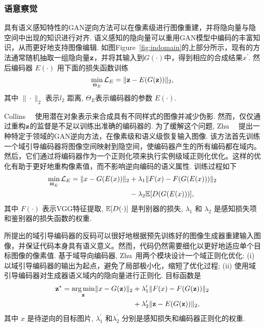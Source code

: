 \subsubsection{语意察觉}
\label{sec:semantic-aware}

具有语义感知特性的GAN逆向方法可以在像素级进行图像重建，并将隐向量与隐空间中出现的知识进行对齐. 
语义感知的隐向量可以重用GAN模型中编码的丰富知识，从而更好地支持图像编辑.
如图Figure~\ref{fig:indomain}的上部分所示，现有的方法通常随机抽取一组隐向量$\mathbf{z}$，并将其输入到$G(\cdot)$中，得到相应的合成结果$x^{\prime}$. 
然后编码器 $E(\cdot)$ 用下面的损失函数训练
\begin{equation}
\min_{\Theta_{E}} \mathcal{L}_{E}=\|\mathbf{z}-E(G(\mathbf{z}))\|_{2},
\end{equation}
其中 $\|\cdot\|_{2}$ 表示$l_{2}$ 距离, $\Theta_{E}$表示编码器的参数 $E(\cdot)$.

Collins~\etal~\cite{collins2020uncovering} 使用潜在对象表示来合成具有不同样式的图像并减少伪影.
然而，仅仅通过重构$\mathbf{z}$的监督是不足以训练出准确的编码器的. 
为了缓解这个问题, Zhu~\etal~\cite{zhu2020indomain} 提出一种特定于领域的GAN逆向方法，在像素级和语义级恢复输入图像.
该方法首先训练一个域引导编码器将图像空间映射到隐空间，使编码器产生的所有编码都在域内。然后，它们通过将编码器作为一个正则化项来执行实例级域正则化优化。这样的优化有助于更好地重构像素值，而不影响逆向编码的语义属性.
训练过程如下
\begin{equation} 
\begin{aligned}
\min_{\Theta_{E}} \mathcal{L}_{E}=\|x-G(E(x))\|_{2} 
&+\lambda_1\|F(x)-F(G(E(x)))\|_{2} \\ 
&-\lambda_2 {\mathbb{E}}[D(G(E(x)))],
\end{aligned}
\end{equation} 
其中 $F(\cdot)$ 表示VGG特征提取, $\mathbb{E}[D(\cdot)]$ 是判别器的损失, $\lambda_1$ 和 $\lambda_2$ 是感知损失项和鉴别器的损失函数的权重.

所提出的域引导编码器的反码可以很好地根据预先训练好的图像生成器重建输入图像，并保证代码本身具有语义意义。然而，代码仍然需要细化以更好地适应单个目标图像的像素值.
基于域导向编码器, Zhu~\etal 用两个模块设计一个域正则化优化:
(i) 以域引导编码器的输出为起点，避免了局部极小化，缩短了优化过程; (ii) 使用域引导编码器对生成器语义域内的隐向量进行正则化. 
目标函数是
\begin{equation}
\begin{aligned}
\mathbf{z}^{*}=\underset{\mathbf{z}}{\arg \min }\|x-G(\mathbf{z})\|_{2} &+\lambda_1^{\prime}\|F(x)-F(G(\mathbf{z}))\|_{2} \\
&+\lambda_2^{\prime}\|\mathbf{z}-E(G(\mathbf{z}))\|_{2},
\end{aligned} 
\end{equation}
其中 $x$ 是待逆向的目标图片, $\lambda_1^{\prime}$ 和$\lambda_2^{\prime}$ 分别是感知损失和编码器正则化的权重.

